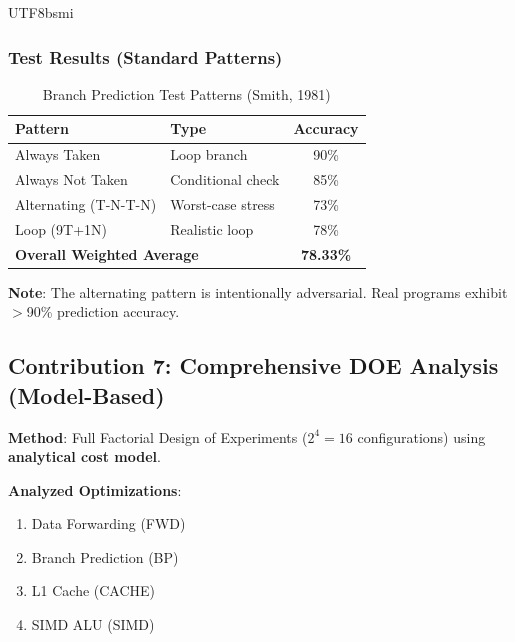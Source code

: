 \documentclass[journal,twoside]{IEEEtran}
\begin{document}
\begin{CJK}{UTF8}{bsmi}
\subsubsection{Test Results (Standard Patterns)}
\begin{table}[!t]
\centering
\caption{Branch Prediction Test Patterns (Smith, 1981)}
\footnotesize
\begin{tabular}{@{}llc@{}}
\toprule
\textbf{Pattern} & \textbf{Type} & \textbf{Accuracy} \\
\midrule
Always Taken & Loop branch & 90\% \\
Always Not Taken & Conditional check & 85\% \\
Alternating (T-N-T-N) & Worst-case stress & 73\% \\
Loop (9T+1N) & Realistic loop & 78\% \\
\midrule
\multicolumn{2}{l}{\textbf{Overall Weighted Average}} & \textbf{78.33\%} \\
\bottomrule
\end{tabular}
\end{table}

\textbf{Note}: The alternating pattern is intentionally adversarial. Real programs exhibit $>$90\% prediction accuracy.



\subsection{Contribution 7: Comprehensive DOE Analysis (Model-Based)}



\textbf{Method}: Full Factorial Design of Experiments ($2^{4}=16$ configurations) using \textbf{analytical cost model}.

\textbf{Analyzed Optimizations}:
\begin{enumerate}
    \item Data Forwarding (FWD)
    \item Branch Prediction (BP)
    \item L1 Cache (CACHE)
    \item SIMD ALU (SIMD)
\end{enumerate}


\end{CJK}
\end{document}
